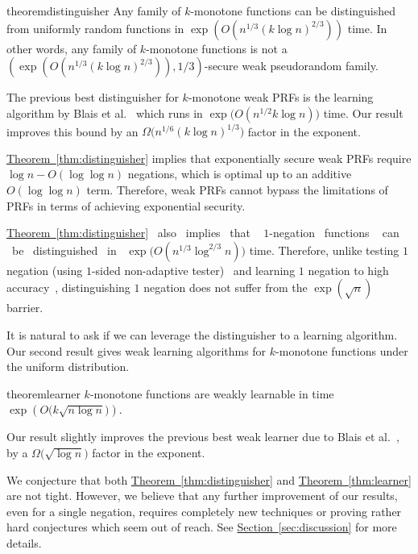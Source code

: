 \documentclass[11pt]{article}
\numberwithin{equation}{section}
\theoremstyle{definition}
\theoremstyle{plain}
\newcommand{\expref}[2]{\hyperref[#2]{#1~\ref{#2}}}
\newcommand{\warn}[1]{#1}
\begin{document}
\begin{restatable}{theorem}{distinguisher}\label{thm:distinguisher}
Any family of $k$-monotone functions can be distinguished from uniformly random functions in $\exp\left(O(n^{1/3}(k\log n)^{2/3})\right)$ time.
In other words, any family of $k$-monotone functions is not a
	  $\left(\exp\left(O(n^{1/3}(k\log n)^{2/3})\right),1/3\right)$-secure
	  weak pseudorandom family.
\end{restatable}

The previous best distinguisher for $k$-monotone weak PRFs is the learning algorithm by Blais et al.~\cite{BCOST15} which runs in $\exp\big(O(n^{1/2}k\log n)\big)$ time. Our result improves
this bound by %
an $\Omega\big(n^{1/6}(k\log n)^{1/3}\big)$ factor in the exponent.

\expref{Theorem}{thm:distinguisher} implies that
%
%
exponentially secure weak PRFs require  %
%
$\log{n}-O(\log\log{n})$ negations, which is optimal up to an additive $O(\log\log{n})$ term. Therefore, weak PRFs cannot bypass the limitations of PRFs in terms of achieving exponential security.

%
\expref{Theorem}{thm:distinguisher} \ also \ implies \ that \
%
$1$-negation \ functions \ %
can \ be \ distinguished \ in \
$\exp\big(O(n^{1/3}\log^{2/3}{n})\big)$ time. Therefore,  unlike testing $1$ negation (using $1$-sided non-adaptive tester)~\cite{GKW19} and learning $1$ negation to high accuracy~\cite{BCOST15}, distinguishing $1$ negation
%
does not %
suffer from the $\exp(\sqrt{n})$ barrier.

It is natural to ask if we can leverage the distinguisher to a learning algorithm. Our second result gives weak learning algorithms for $k$-monotone functions under the uniform distribution.
\begin{restatable}{theorem}{learner}\label{thm:learner}
	$k$-monotone functions are weakly learnable in time $\exp\left(O\big(k\sqrt{n\log n}\big)\right)$.
\end{restatable}

Our result slightly improves the previous best weak learner due to Blais et al.~\cite{BCOST15}, by a $\Omega\big(\sqrt{\log n}\big)$ factor in the exponent.

\warn{We conjecture that both \expref{Theorem}{thm:distinguisher} and \expref{Theorem}{thm:learner} are not tight. However, we believe that any further improvement of our results, even for a single negation, 
%
requires %
completely new techniques or proving rather hard conjectures which seem out of reach. See \expref{Section}{sec:discussion} for more details.}
\end{document}

